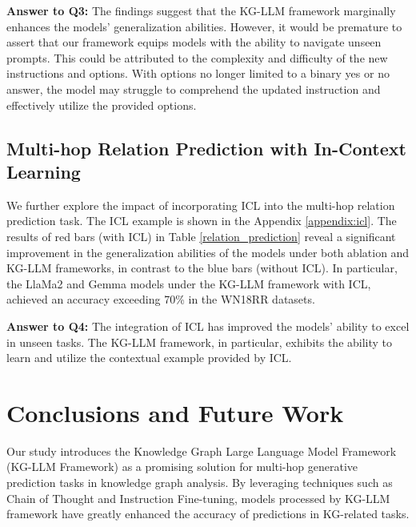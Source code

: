 \documentclass[pmlr]{jmlr}%
\begin{document}
\noindent
\textbf{Answer to Q3:} The findings suggest that the KG-LLM framework marginally enhances the models' generalization abilities. However, it would be premature to assert that our framework equips models with the ability to navigate unseen prompts. This could be attributed to the complexity and difficulty of the new instructions and options. With options no longer limited to a binary yes or no answer, the model may struggle to comprehend the updated instruction and effectively utilize the provided options.


\subsection{Multi-hop Relation Prediction with In-Context Learning}

We further explore the impact of incorporating ICL into the multi-hop relation prediction task. The ICL example is shown in the Appendix \ref{appendix:icl}. The results of red bars (with ICL) in Table \ref{relation_prediction} reveal a significant improvement in the generalization abilities of the models under both ablation and KG-LLM frameworks, in contrast to the blue bars (without ICL). In particular, the LlaMa2 and Gemma models under the KG-LLM framework with ICL, achieved an accuracy exceeding 70\% in the WN18RR datasets.

\noindent
\textbf{Answer to Q4:} The integration of ICL has improved the models' ability to excel in unseen tasks. The KG-LLM framework, in particular, exhibits the ability to learn and utilize the contextual example provided by ICL.

\section{Conclusions and Future Work}

Our study introduces the Knowledge Graph Large Language Model Framework (KG-LLM Framework) as a promising solution for multi-hop generative prediction tasks in knowledge graph analysis. By leveraging techniques such as Chain of Thought and Instruction Fine-tuning, models processed by KG-LLM framework have greatly enhanced the accuracy of predictions in KG-related tasks. 

\end{document}
